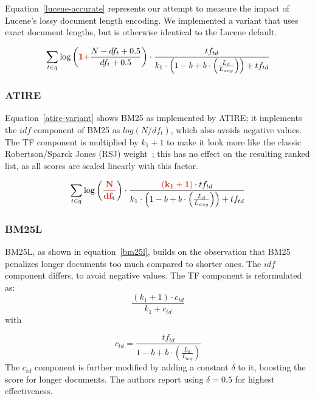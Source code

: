 Equation~\ref{lucene-accurate} represents our attempt to measure the impact of Lucene’s lossy document length encoding. We implemented a variant that uses exact document lengths, but is otherwise identical to the Lucene default.

\begin{equation}
	\label{lucene-accurate}
	\sum_{t\in q}\log\left(\mathbf{\begingroup\color{ruhuisstijlrood}1 +\endgroup} \frac{N-df_t+0.5}{df_t+0.5}\right)\cdot\frac{tf_{td}}{k_1\cdot \left(1-b+b\cdot\left(\frac{L_d}{L_{avg}}\right)\right)+tf_{td}}
\end{equation}

\subsubsection{ATIRE~\cite{ATIRE}}
Equation~\ref{atire-variant} shows BM25 as implemented by ATIRE; it implements the $idf$ component of BM25 as $log(N/df_{t})$, which also avoids negative values. The TF component is multiplied by $k_1+1$ to make it look more like the classic Robertson/Sparck Jones (RSJ) weight~\cite{RSJ}; this has no effect on the resulting ranked list, as all scores are scaled linearly with this factor.

\begin{equation}
	\label{atire-variant}
	\sum_{t\in q}\log\left(\mathbf{\begingroup\color{ruhuisstijlrood}\frac{N}{df_t}\endgroup}\right)\cdot\frac{\mathbf{\begingroup\color{ruhuisstijlrood}\left(k_1 + 1\right)\endgroup}\cdot tf_{td}}{k_1\cdot\left(1-b+b\cdot\left(\frac{L_{d}}{L_{avg}}\right)\right)+tf_{td}}
\end{equation}

\subsubsection{BM25L~\cite{bm25l}}
BM25L, as shown in equation~\ref{bm25l}, builds on the observation that BM25 penalizes longer documents too much compared to shorter ones. The $idf$ component differs, to avoid negative values. The TF component is reformulated as:
\begin{equation}
	\frac{\left(k_1+1\right)\cdot c_{td}}{k_1+c_{td}}  
\end{equation}
with 

\begin{equation}
	c_{td} = \frac{tf_{td}}{1 - b + b \cdot \left(\frac{L_d}{L_{avg}}\right)}  
\end{equation}
The $c_{td}$ component is further modified by adding a constant $\delta$ to it, boosting the score for longer documents. The authors report using $\delta = 0.5$ for highest effectiveness.

